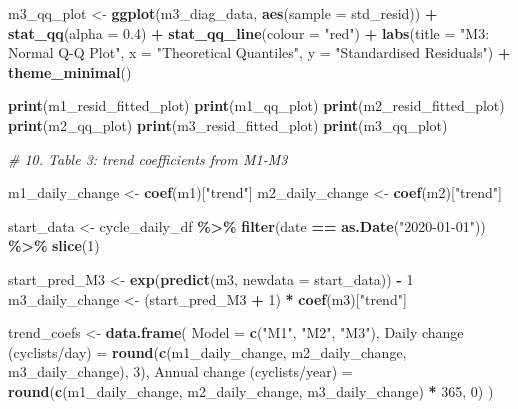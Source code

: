 \documentclass[
]{article}
\newenvironment{Shaded}{\begin{snugshade}}{\end{snugshade}}
\newcommand{\AttributeTok}[1]{\textcolor[rgb]{0.13,0.29,0.53}{#1}}
\newcommand{\CommentTok}[1]{\textcolor[rgb]{0.56,0.35,0.01}{\textit{#1}}}
\newcommand{\DecValTok}[1]{\textcolor[rgb]{0.00,0.00,0.81}{#1}}
\newcommand{\FloatTok}[1]{\textcolor[rgb]{0.00,0.00,0.81}{#1}}
\newcommand{\FunctionTok}[1]{\textcolor[rgb]{0.13,0.29,0.53}{\textbf{#1}}}
\newcommand{\NormalTok}[1]{#1}
\newcommand{\OtherTok}[1]{\textcolor[rgb]{0.56,0.35,0.01}{#1}}
\newcommand{\SpecialCharTok}[1]{\textcolor[rgb]{0.81,0.36,0.00}{\textbf{#1}}}
\newcommand{\StringTok}[1]{\textcolor[rgb]{0.31,0.60,0.02}{#1}}
\begin{document}
\begin{Shaded}
\begin{Highlighting}[]
\NormalTok{m3\_qq\_plot }\OtherTok{\textless{}{-}} \FunctionTok{ggplot}\NormalTok{(m3\_diag\_data, }\FunctionTok{aes}\NormalTok{(}\AttributeTok{sample =}\NormalTok{ std\_resid)) }\SpecialCharTok{+}
  \FunctionTok{stat\_qq}\NormalTok{(}\AttributeTok{alpha =} \FloatTok{0.4}\NormalTok{) }\SpecialCharTok{+}
  \FunctionTok{stat\_qq\_line}\NormalTok{(}\AttributeTok{colour =} \StringTok{"red"}\NormalTok{) }\SpecialCharTok{+}
  \FunctionTok{labs}\NormalTok{(}\AttributeTok{title =} \StringTok{"M3: Normal Q{-}Q Plot"}\NormalTok{,}
       \AttributeTok{x =} \StringTok{"Theoretical Quantiles"}\NormalTok{, }\AttributeTok{y =} \StringTok{"Standardised Residuals"}\NormalTok{) }\SpecialCharTok{+}
  \FunctionTok{theme\_minimal}\NormalTok{()}

\FunctionTok{print}\NormalTok{(m1\_resid\_fitted\_plot)}
\FunctionTok{print}\NormalTok{(m1\_qq\_plot)}
\FunctionTok{print}\NormalTok{(m2\_resid\_fitted\_plot)}
\FunctionTok{print}\NormalTok{(m2\_qq\_plot)}
\FunctionTok{print}\NormalTok{(m3\_resid\_fitted\_plot)}
\FunctionTok{print}\NormalTok{(m3\_qq\_plot)}

\CommentTok{\# 10. Table 3: trend coefficients from M1{-}M3}

\NormalTok{m1\_daily\_change }\OtherTok{\textless{}{-}} \FunctionTok{coef}\NormalTok{(m1)[}\StringTok{"trend"}\NormalTok{]}
\NormalTok{m2\_daily\_change }\OtherTok{\textless{}{-}} \FunctionTok{coef}\NormalTok{(m2)[}\StringTok{"trend"}\NormalTok{]}

\NormalTok{start\_data }\OtherTok{\textless{}{-}}\NormalTok{ cycle\_daily\_df }\SpecialCharTok{\%\textgreater{}\%}
  \FunctionTok{filter}\NormalTok{(date }\SpecialCharTok{==} \FunctionTok{as.Date}\NormalTok{(}\StringTok{"2020{-}01{-}01"}\NormalTok{)) }\SpecialCharTok{\%\textgreater{}\%}
  \FunctionTok{slice}\NormalTok{(}\DecValTok{1}\NormalTok{)}

\NormalTok{start\_pred\_M3 }\OtherTok{\textless{}{-}} \FunctionTok{exp}\NormalTok{(}\FunctionTok{predict}\NormalTok{(m3, }\AttributeTok{newdata =}\NormalTok{ start\_data)) }\SpecialCharTok{{-}} \DecValTok{1}
\NormalTok{m3\_daily\_change }\OtherTok{\textless{}{-}}\NormalTok{ (start\_pred\_M3 }\SpecialCharTok{+} \DecValTok{1}\NormalTok{) }\SpecialCharTok{*} \FunctionTok{coef}\NormalTok{(m3)[}\StringTok{"trend"}\NormalTok{]}

\NormalTok{trend\_coefs }\OtherTok{\textless{}{-}} \FunctionTok{data.frame}\NormalTok{(}
  \AttributeTok{Model =} \FunctionTok{c}\NormalTok{(}\StringTok{"M1"}\NormalTok{, }\StringTok{"M2"}\NormalTok{, }\StringTok{"M3"}\NormalTok{),}
  \StringTok{\textasciigrave{}}\AttributeTok{Daily change (cyclists/day)}\StringTok{\textasciigrave{}} \OtherTok{=} \FunctionTok{round}\NormalTok{(}\FunctionTok{c}\NormalTok{(m1\_daily\_change, m2\_daily\_change, m3\_daily\_change), }\DecValTok{3}\NormalTok{),}
  \StringTok{\textasciigrave{}}\AttributeTok{Annual change (cyclists/year)}\StringTok{\textasciigrave{}} \OtherTok{=} \FunctionTok{round}\NormalTok{(}\FunctionTok{c}\NormalTok{(m1\_daily\_change, m2\_daily\_change, m3\_daily\_change) }\SpecialCharTok{*} \DecValTok{365}\NormalTok{, }\DecValTok{0}\NormalTok{)}
\NormalTok{)}


\end{Highlighting}
\end{Shaded}
\end{document}
